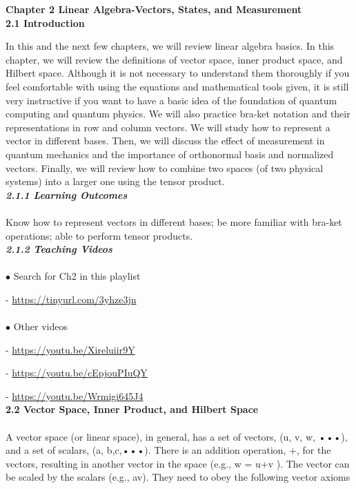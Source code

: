 \documentclass{article}
\newcommand{\bfit}[1]{\textit{\textbf{#1}}}
\begin{document}
\noindent
\textbf{\Large Chapter 2
Linear Algebra-Vectors, States, and Measurement}
\\[30pt]
\textbf{\large 2.1 Introduction}

In this and the next few chapters, we will review linear algebra basics. In this chapter, we will review the definitions of vector space, inner product space, and Hilbert space. Although it is not necessary to understand them thoroughly if you feel comfortable with using the equations and mathematical tools given, it is still very instructive if you want to have a basic idea of the foundation of quantum computing and quantum physics. We will also practice bra-ket notation and their representations in row and column vectors. We will study how to represent a vector in different bases. Then, we will discuss the effect of measurement in quantum mechanics and the importance of orthonormal basis and normalized vectors. Finally, we will review how to combine two spaces (of two physical systems) into a larger one using the tensor product.
\\[20pt]
\bfit{\large 2.1.1 Learning Outcomes}\\\\
Know how to represent vectors in different bases; be more familiar with bra-ket operations; able to perform tensor products.
\\[20pt]
\bfit{\large 2.1.2 Teaching Videos}\\\\
$\bullet$ Search for Ch2 in this playlist

- \url{https://tinyurl.com/3yhze3jn}\\\\
$\bullet$ Other videos

- \url{https://youtu.be/Xireluiir9Y}

- \url{https://youtu.be/cEpjouPIuQY}

- \url{https://youtu.be/Wrmigi645J4}
\\[20pt]
\textbf{\large 2.2 Vector Space, Inner Product, and Hilbert Space}
\\\\
A vector space (or linear space), in general, has a set of vectors, (u, v, w, •••), and a set of scalars, (a, b,c,•••). There is an addition operation, +, for the vectors,
resulting in another vector in the space (e.g., w = u+v ). The vector can be scaled
by the scalars (e.g., av). They need to obey the following vector axioms
\end{document}
